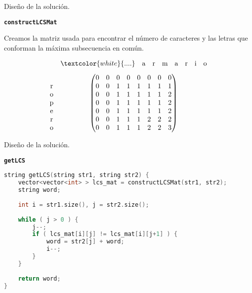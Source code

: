 \documentclass[10pt, xcolor=table]{beamer}
\begin{document}
\begin{frame}[fragile]{Diseño de la solución. }
\begin{center}
	\textbf{\large{\texttt{constructLCSMat}}}
\end{center}
Creamos la matriz usada para encontrar el número de caracteres y las letras que conforman la máxima subsecuencia en común.

$$
\begin{matrix}
 & \begin{matrix} \textcolor{white}{....}\vspace{0.3cm}&\text{{a}} & \text{{r}} & \text{{m}} & \text{{a}} & \text{{r}} & \text{{i}} & \text{{o}} \end{matrix} \\
\begin{matrix}\\ \text{{r}}\\\text{{o}}\\\text{{p}}\\\text{{e}}\\\text{{r}}\\\text{{o}} \end{matrix} & \left(\begin{matrix}
0 & 0 & 0 &0&0&0&0&0\\
0&0&1&1&1&1&1&1\\
0&0&1&1&1&1&1&2\\
0&0&1&1&1&1&1&2\\
0&0&1&1&1&1&1&2\\
0&0&1&1&1&2&2&2\\
0&0&1&1&1&2&2&3\\
\end{matrix}\right)
\end{matrix}
$$
\end{frame}

\begin{frame}[fragile]{Diseño de la solución. }
\begin{center}
	\textbf{\large{\texttt{getLCS}}}
\end{center}
\begin{lstlisting}[language=C]
string getLCS(string str1, string str2) {
	vector<vector<int> > lcs_mat = constructLCSMat(str1, str2);
	string word;
	
	int i = str1.size(), j = str2.size();
	
	while ( j > 0 ) {
		j--;
		if ( lcs_mat[i][j] != lcs_mat[i][j+1] ) {
			word = str2[j] + word;
			i--;
		}
	}
	
	return word;
}
\end{lstlisting}
\end{frame}
\end{document}
